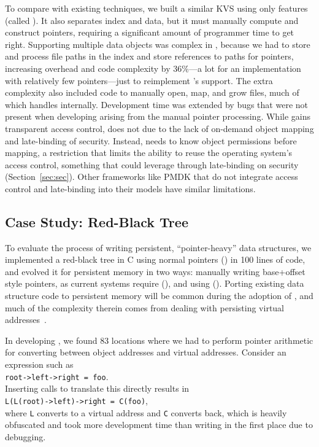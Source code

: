 To compare with existing techniques, we built a
similar KVS using only \unix features (called \unixkv). It also separates index and data, but it
must manually compute and construct pointers, requiring a significant amount of programmer time to
get right.
Supporting multiple data objects was complex in \unixkv, because we had to store and process file
paths in the index and store references to paths for pointers, increasing overhead and code
complexity by 36\%---a lot for an implementation with relatively few pointers---just to reimplement
\Twizzler's support. The extra complexity also included code to manually open, map, and
grow files, much of which \Twizzler handles internally. Development time was extended by
bugs that were not present when developing \nvkv arising from the manual pointer processing.  While \nvkv
gains transparent access control, \unixkv does not due to the lack of
on-demand object mapping and late-binding of security. Instead, \unixkv needs to know object permissions before
mapping,
a restriction that limits the ability to reuse the operating system's access control, something that
\nvkv could leverage through late-binding on security (Section~\ref{sec:sec}). Other frameworks like PMDK
that do not integrate access control and late-binding into their models have similar
limitations.


\subsection{Case Study: Red-Black Tree}
To evaluate the process of writing persistent, ``pointer-heavy'' data
structures,
we implemented a red-black tree in C using normal pointers (\ramrbt)
in 100 lines of code,
and evolved it for persistent memory in two ways: manually writing
base+offset style pointers, as current systems require (\unixrbt),
and using \Twizzler (\nvrbt).
Porting existing data structure code to persistent memory
will be common during the adoption of \NVM, and much of the complexity therein
comes from dealing with persisting virtual addresses~\cite{virendra:hotstorage17}.

In developing \unixrbt, we found 83 locations where we had to perform pointer arithmetic for
converting between object addresses and virtual addresses.  Consider an expression such as\\
\hspace*{10mm}\texttt{root->left->right = foo}.\\Inserting calls to translate this directly results in\\
\hspace*{10mm}\texttt{L(L(root)->left)->right = C(foo)},\\ where \texttt{L} converts to a virtual address and
\texttt{C} converts back, which is heavily obfuscated and took more development time than writing
\ramrbt in the first place due to debugging.

